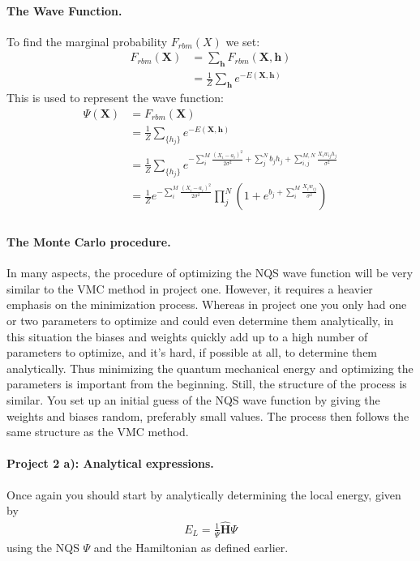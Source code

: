 \documentclass[%
oneside,                 %
final,                   %
10pt]{article}
\begin{document}
\paragraph{The Wave Function.}
To find the marginal probability $F_{rbm}(X)$ we set:
\begin{align}
	F_{rbm}(\mathbf{X}) &= \sum_\mathbf{h} F_{rbm}(\mathbf{X}, \mathbf{h}) \\
				&= \frac{1}{Z}\sum_\mathbf{h} e^{-E(\mathbf{X}, \mathbf{h})}
\end{align}
This is used to represent the wave function:
\begin{align}
\Psi (\mathbf{X}) &= F_{rbm}(\mathbf{X}) \\
&= \frac{1}{Z}\sum_{\{h_j\}} e^{-E(\mathbf{X}, \mathbf{h})} \\
&= \frac{1}{Z} \sum_{\{h_j\}} e^{-\sum_i^M \frac{(X_i - a_i)^2}{2\sigma^2} + \sum_j^N b_j h_j + \sum_{i,j}^{M,N} \frac{X_i w_{ij} h_j}{\sigma^2}} \\
&= \frac{1}{Z} e^{-\sum_i^M \frac{(X_i - a_i)^2}{2\sigma^2}} \prod_j^N (1 + e^{b_j + \sum_i^M \frac{X_i w_{ij}}{\sigma^2}}) \\
\end{align}

\paragraph{The Monte Carlo procedure.}
In many aspects, the procedure of optimizing the NQS wave function
will be very similar to the VMC method in project one. However, it
requires a heavier emphasis on the minimization process. Whereas in
project one you only had one or two parameters to optimize and could
even determine them analytically, in this situation the biases and
weights quickly add up to a high number of parameters to optimize, and
it's hard, if possible at all, to determine them analytically. Thus
minimizing the quantum mechanical energy and optimizing the parameters
is important from the beginning. Still, the structure of the process
is similar. You set up an initial guess of the NQS wave function by
giving the weights and biases random, preferably small values. The
process then follows the same structure as the VMC method.

\paragraph{Project 2 a): Analytical expressions.}
Once again you should start by analytically determining the local energy, given by
\begin{align}
	E_L = \frac{1}{\Psi} \hat{\mathbf{H}} \Psi
\end{align}
using the NQS $\Psi$ and the Hamiltonian as defined earlier.
\end{document}
